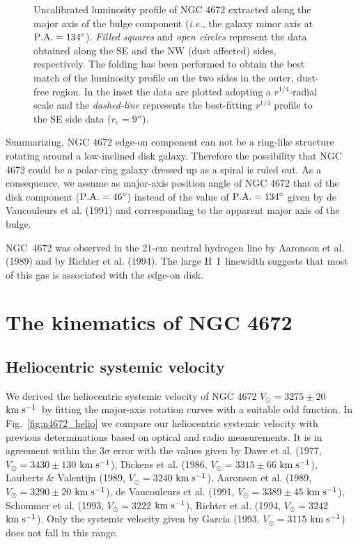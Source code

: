 \documentclass[twocolumns]{aa}
\def\kms{$\rm km\;s^{-1}$}
\def\dg{^\circ}
\def\hi{H~{\scriptsize I}}
\begin{document}
\begin{figure}[ht!]
\vspace*{11cm}
\caption[]{Uncalibrated luminosity profile of NGC 4672 extracted along
the major axis of the bulge component ({\it i.e.\/}, the galaxy minor
axis at $\rm P.A.=134\dg$). {\it Filled squares\/} and {\it open
circles\/} represent the data obtained along the SE and the NW (dust
affected) sides, respectively. The folding has been performed to
obtain the best match of the luminosity profile on the two sides in
the outer, dust-free region.  In the inset the data are plotted
adopting a $r^{1/4}$-radial scale and the {\it dashed-line\/}
represents the best-fitting $r^{1/4}$ profile to the SE side data
($r_e = 9''$).}
\label{fig:n4672_bul}
\end{figure}

Summarizing, NGC 4672 edge-on component can not be a ring-like
structure rotating around a low-inclined disk galaxy. Therefore the
possibility that NGC 4672 could be a polar-ring galaxy dressed up as a
spiral is ruled out. As a consequence, we assume as major-axis
position angle of NGC 4672 that of the disk component ($\rm
P.A.=46\dg$) instead of the value of $\rm P.A.=134\dg$ given by de
Vaucouleurs et al. (1991) and corresponding to the apparent major axis
of the bulge.

NGC~4672 was observed in the 21-cm neutral hydrogen line by
Aaronson et al. (1989) and by Richter et al. (1994).  The large \hi\
linewidth suggests that most of this gas is associated with the
edge-on disk. 


\section{The kinematics of NGC 4672}
\label{sec:n4672_kinematics}


\subsection{Heliocentric systemic velocity}

We derived the heliocentric systemic velocity of NGC 4672 
$V_\odot = 3275 \pm 20$ \kms\ by fitting the major-axis rotation curves 
with a suitable odd function. 
In Fig.~\ref{fig:n4672_helio} we compare our heliocentric
systemic velocity with previous determinations based on optical and
radio measurements. It is in agreement wi\-thin the $3\sigma$
error with the values given by Dawe et al. (1977,
$V_\odot = 3430 \pm 130$ \kms), Dickens et al. (1986,
$V_\odot = 3315 \pm 66$ \kms), Lauberts \& Valentijn (1989, $V_\odot =
3240$ \kms), Aa\-ronson et al. (1989, $V_\odot = 3290 \pm 20$ \kms), de
Vaucouleurs et al.  (1991, $V_\odot = 3389 \pm 45$ \kms), Schommer et
al. (1993, $V_\odot = 3222$ \kms), Ri\-chter et al. (1994,
$V_\odot = 3242$ \kms). Only the systemic velocity given by Garcia
(1993, $V_\odot = 3115$ \kms) does not fall in this range.
\end{document}
